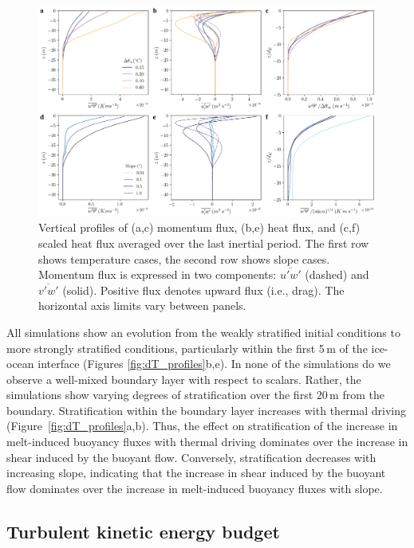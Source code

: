 \documentclass[tc, manuscript]{copernicus}
\begin{document}
\begin{figure}[t]
\includegraphics[width=12cm]{fig3.pdf}
\caption{Vertical profiles of (a,c) momentum flux, (b,e) heat flux, and (c,f) scaled heat flux averaged over the last inertial period. The first row shows temperature cases, the second row shows slope cases. Momentum flux is expressed in two components:  $\overline{u'w'}$ (dashed) and $\overline{v'w'}$ (solid). Positive flux denotes upward flux (i.e., drag). The horizontal axis limits vary between panels.}
\label{fig:flux_profiles}
\end{figure}

All simulations show an evolution from the weakly stratified initial conditions to more strongly stratified conditions, particularly within the first 5\,\unit{m} of the ice-ocean interface (Figures \ref{fig:dT_profiles}b,e). In none of the simulations do we observe a well-mixed boundary layer with respect to scalars. Rather, the simulations show varying degrees of stratification over the first 20\,\unit{m} from the boundary. Stratification within the boundary layer increases with thermal driving (Figure~\ref{fig:dT_profiles}a,b). Thus, the effect on stratification of the increase in melt-induced buoyancy fluxes with thermal driving dominates over the increase in shear induced by the buoyant flow. Conversely, stratification decreases with increasing slope, indicating that the increase in shear induced by the buoyant flow dominates over the increase in melt-induced buoyancy fluxes with slope. 

\subsection{Turbulent kinetic energy budget}
\end{document}
